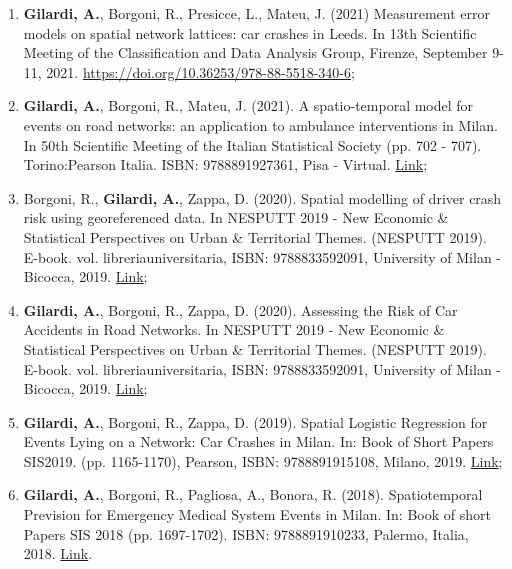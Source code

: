 \documentclass[11pt,a4paper,sans]{moderncv}
\begin{document}
\begin{enumerate}
  	\item \textbf{Gilardi, A.}, Borgoni, R., Presicce, L., Mateu, J. (2021) Measurement error models on spatial network lattices: car crashes in Leeds. In 13th Scientific Meeting of the Classification and Data Analysis Group, Firenze, September 9-11, 2021. \url{https://doi.org/10.36253/978-88-5518-340-6};
  	\item \textbf{Gilardi, A.}, Borgoni, R., Mateu, J. (2021). A spatio-temporal model for events on road networks: an application to ambulance interventions in Milan. In 50th Scientific Meeting of the Italian Statistical Society (pp. 702 - 707). Torino:Pearson Italia. ISBN: 9788891927361, Pisa - Virtual. \href{https://it.pearson.com/content/dam/region-core/italy/pearson-italy/pdf/Docenti/Universit%C3%A0/pearson-sis-book-2021-parte-1.pdf}{Link}; 
  	\item Borgoni, R., \textbf{Gilardi, A.}, Zappa, D. (2020). Spatial modelling of driver crash risk using georeferenced data. In NESPUTT 2019 - New Economic \& Statistical Perspectives on Urban \& Territorial Themes. (NESPUTT 2019). E-book. vol. libreriauniversitaria, ISBN: 9788833592091, University of Milan - Bicocca, 2019. \href{https://www.libreriauniversitaria.it/ebook/9788833592091/autore-riccardo-borgoni/new-economic-statistical-perspectives-on-urban-and-territorial-themes-nesputt-2019-e-book.htm}{Link};
  	\item \textbf{Gilardi, A.}, Borgoni, R., Zappa, D. (2020). Assessing the Risk of Car Accidents in Road Networks. In NESPUTT 2019 - New Economic \& Statistical Perspectives on Urban \& Territorial Themes. (NESPUTT 2019). E-book. vol. libreriauniversitaria, ISBN: 9788833592091, University of Milan - Bicocca, 2019.  \href{https://www.libreriauniversitaria.it/ebook/9788833592091/autore-riccardo-borgoni/new-economic-statistical-perspectives-on-urban-and-territorial-themes-nesputt-2019-e-book.htm}{Link};
  	\item \textbf{Gilardi, A.}, Borgoni, R., Zappa, D. (2019). Spatial Logistic Regression for Events Lying on a Network: Car Crashes in Milan. In: Book of Short Papers SIS2019. (pp. 1165-1170), Pearson, ISBN: 9788891915108, Milano, 2019.   \href{https://it.pearson.com/content/dam/region-core/italy/pearson-italy/pdf/Dirigenti%20e%20istituzioni/ISTITUZIONI-HE-PDF-sis2019_V4.pdf}{Link};
  	\item \textbf{Gilardi, A.}, Borgoni, R., Pagliosa, A., Bonora, R. (2018).  Spatiotemporal Prevision for Emergency Medical System Events in Milan. In: Book of short Papers SIS 2018 (pp. 1697-1702). ISBN: 9788891910233, Palermo, Italia, 2018. \href{https://it.pearson.com/content/dam/region-core/italy/pearson-italy/pdf/Dirigenti%20e%20istituzioni/ISTITUZIONI%20-%20HE%20-%20PDF%20-%20SIS%20V4.pdf}{Link}. 
  \end{enumerate}
\end{document}
